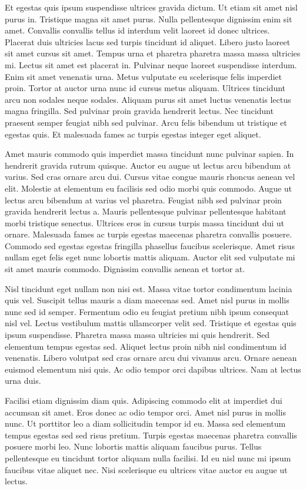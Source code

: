 \documentclass[twocolumn,twoside]{base/ajstd}
\begin{document}
Et egestas quis ipsum suspendisse ultrices gravida dictum. Ut etiam sit amet nisl purus in. Tristique magna sit amet purus. Nulla pellentesque dignissim enim sit amet. Convallis convallis tellus id interdum velit laoreet id donec ultrices. Placerat duis ultricies lacus sed turpis tincidunt id aliquet. Libero justo laoreet sit amet cursus sit amet. Tempus urna et pharetra pharetra massa massa ultricies mi. Lectus sit amet est placerat in. Pulvinar neque laoreet suspendisse interdum. Enim sit amet venenatis urna. Metus vulputate eu scelerisque felis imperdiet proin. Tortor at auctor urna nunc id cursus metus aliquam. Ultrices tincidunt arcu non sodales neque sodales. Aliquam purus sit amet luctus venenatis lectus magna fringilla. Sed pulvinar proin gravida hendrerit lectus. Nec tincidunt praesent semper feugiat nibh sed pulvinar. Arcu felis bibendum ut tristique et egestas quis. Et malesuada fames ac turpis egestas integer eget aliquet.

Amet mauris commodo quis imperdiet massa tincidunt nunc pulvinar sapien. In hendrerit gravida rutrum quisque. Auctor eu augue ut lectus arcu bibendum at varius. Sed cras ornare arcu dui. Cursus vitae congue mauris rhoncus aenean vel elit. Molestie at elementum eu facilisis sed odio morbi quis commodo. Augue ut lectus arcu bibendum at varius vel pharetra. Feugiat nibh sed pulvinar proin gravida hendrerit lectus a. Mauris pellentesque pulvinar pellentesque habitant morbi tristique senectus. Ultrices eros in cursus turpis massa tincidunt dui ut ornare. Malesuada fames ac turpis egestas maecenas pharetra convallis posuere. Commodo sed egestas egestas fringilla phasellus faucibus scelerisque. Amet risus nullam eget felis eget nunc lobortis mattis aliquam. Auctor elit sed vulputate mi sit amet mauris commodo. Dignissim convallis aenean et tortor at.

Nisl tincidunt eget nullam non nisi est. Massa vitae tortor condimentum lacinia quis vel. Suscipit tellus mauris a diam maecenas sed. Amet nisl purus in mollis nunc sed id semper. Fermentum odio eu feugiat pretium nibh ipsum consequat nisl vel. Lectus vestibulum mattis ullamcorper velit sed. Tristique et egestas quis ipsum suspendisse. Pharetra massa massa ultricies mi quis hendrerit. Sed elementum tempus egestas sed. Aliquet lectus proin nibh nisl condimentum id venenatis. Libero volutpat sed cras ornare arcu dui vivamus arcu. Ornare aenean euismod elementum nisi quis. Ac odio tempor orci dapibus ultrices. Nam at lectus urna duis.

Facilisi etiam dignissim diam quis. Adipiscing commodo elit at imperdiet dui accumsan sit amet. Eros donec ac odio tempor orci. Amet nisl purus in mollis nunc. Ut porttitor leo a diam sollicitudin tempor id eu. Massa sed elementum tempus egestas sed sed risus pretium. Turpis egestas maecenas pharetra convallis posuere morbi leo. Nunc lobortis mattis aliquam faucibus purus. Tellus pellentesque eu tincidunt tortor aliquam nulla facilisi. Id eu nisl nunc mi ipsum faucibus vitae aliquet nec. Nisi scelerisque eu ultrices vitae auctor eu augue ut lectus.












\atColsEnd{\vfill}
\end{document}
